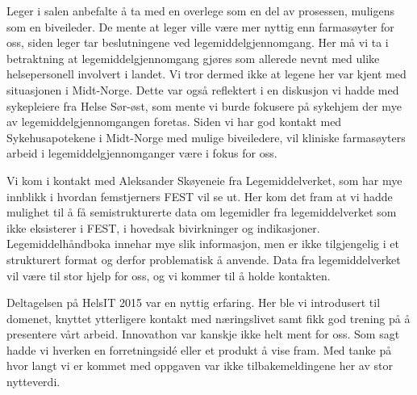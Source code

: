 Leger i salen anbefalte å ta med en overlege som en del av prosessen, muligens som en biveileder. De mente at leger ville være mer nyttig enn farmasøyter for oss, siden leger tar beslutningene ved legemiddelgjennomgang. Her må vi ta i betraktning at legemiddelgjennomgang gjøres som allerede nevnt med ulike helsepersonell involvert i landet. Vi tror dermed ikke at legene her var kjent med situasjonen i Midt-Norge. Dette var også reflektert i en diskusjon vi hadde med sykepleiere fra Helse Sør-øst, som mente vi burde fokusere på sykehjem der mye av legemiddelgjennomgangen foretas. Siden vi har god kontakt med Sykehusapotekene i Midt-Norge med mulige biveiledere, vil kliniske farmasøyters arbeid i legemiddelgjennomganger være i fokus for oss.

Vi kom i kontakt med Aleksander Skøyeneie fra Legemiddelverket, som har mye innblikk i hvordan femstjerners FEST vil se ut. Her kom det fram at vi hadde mulighet til å få semistrukturerte data om legemidler fra legemiddelverket som ikke eksisterer i FEST, i hovedsak bivirkninger og indikasjoner. Legemiddelhåndboka innehar mye slik informasjon, men er ikke tilgjengelig i et strukturert format og derfor problematisk å anvende. Data fra legemiddelverket vil være til stor hjelp for oss, og vi kommer til å holde kontakten.

Deltagelsen på HelsIT 2015 var en nyttig erfaring. Her ble vi introdusert til domenet, knyttet ytterligere kontakt med næringslivet samt fikk god trening på å presentere vårt arbeid. Innovathon var kanskje ikke helt ment for oss. Som sagt hadde vi hverken en forretningsidé eller et produkt å vise fram. Med tanke på hvor langt vi er kommet med oppgaven var ikke tilbakemeldingene her av stor nytteverdi. 



